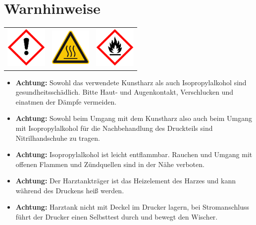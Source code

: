 \documentclass{\basedir/fablab-document}
\begin{document}
\section{Warnhinweise}
\begin{table}[h]
	\centering
	\begin{tabular}{ccc}
		
		\includegraphics[width=2cm]{bilder/GHSa.png}  &
		\includegraphics[width=2cm]{bilder/GHShs.jpg}  & \includegraphics[width=2cm]{bilder/GHSf.png} \\
	\end{tabular}
\end{table}

\begin{itemize}
	\item \textbf{Achtung:} Sowohl das verwendete Kunstharz als auch Isopropylalkohol sind gesundheitsschädlich. Bitte Haut- und Augenkontakt, Verschlucken und einatmen der Dämpfe vermeiden. \\
	\item \textbf{Achtung:} Sowohl beim Umgang mit dem Kunstharz also auch beim Umgang mit Isopropylalkohol für die Nachbehandlung des Druckteils sind Nitrilhandschuhe zu tragen. \\
	\item \textbf{Achtung:} Isopropylalkohol ist leicht entflammbar. Rauchen und Umgang mit offenen Flammen und Zündquellen sind in der Nähe verboten. \\
	
	\item \textbf{Achtung:} Der Harztankträger ist das Heizelement des Harzes und kann während des Druckens heiß werden.
	
	\item \textbf{Achtung:} Harztank nicht mit Deckel im Drucker lagern, bei Stromanschluss führt der Drucker einen Selbsttest durch und bewegt den Wischer.
\end{itemize}
\end{document}
